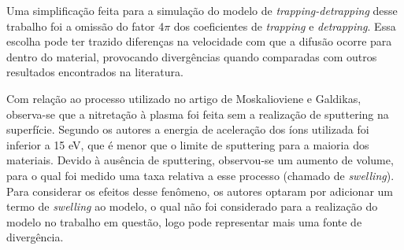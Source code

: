 Uma simplificação feita para a simulação do modelo de \textit{trapping-detrapping} desse trabalho foi a omissão do fator 4$\pi$ dos coeficientes de \textit{trapping} e  \textit{detrapping}. Essa escolha pode ter trazido diferenças na velocidade com que a difusão ocorre para dentro do material, provocando divergências quando comparadas com outros resultados encontrados na literatura.

Com relação ao processo utilizado no artigo de Moskalioviene e Galdikas, observa-se que a nitretação à plasma foi feita sem a realização de sputtering na superfície. Segundo os autores a energia de aceleração dos íons utilizada foi inferior a 15 eV, que é menor que o limite de sputtering para a maioria dos materiais. Devido à ausência de sputtering, observou-se um aumento de volume, para o qual foi medido uma taxa relativa a esse processo (chamado de \textit{swelling}). Para considerar os efeitos desse fenômeno, os autores optaram por adicionar um termo de \textit{swelling} ao modelo, o qual não foi considerado para a realização do modelo no trabalho em questão, logo pode representar mais uma fonte de divergência.